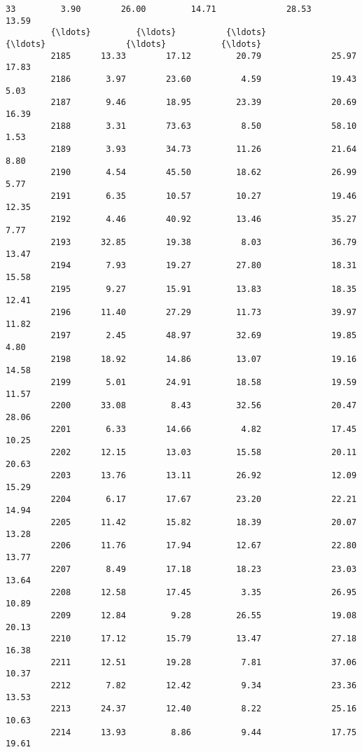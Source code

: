 \documentclass[11pt]{llncs}
\begin{document}
\begin{Verbatim}[commandchars=\\\{\}]
         33         3.90        26.00         14.71              28.53         13.59   
         {\ldots}         {\ldots}          {\ldots}           {\ldots}                {\ldots}           {\ldots}   
         2185      13.33        17.12         20.79              25.97         17.83   
         2186       3.97        23.60          4.59              19.43          5.03   
         2187       9.46        18.95         23.39              20.69         16.39   
         2188       3.31        73.63          8.50              58.10          1.53   
         2189       3.93        34.73         11.26              21.64          8.80   
         2190       4.54        45.50         18.62              26.99          5.77   
         2191       6.35        10.57         10.27              19.46         12.35   
         2192       4.46        40.92         13.46              35.27          7.77   
         2193      32.85        19.38          8.03              36.79         13.47   
         2194       7.93        19.27         27.80              18.31         15.58   
         2195       9.27        15.91         13.83              18.35         12.41   
         2196      11.40        27.29         11.73              39.97         11.82   
         2197       2.45        48.97         32.69              19.85          4.80   
         2198      18.92        14.86         13.07              19.16         14.58   
         2199       5.01        24.91         18.58              19.59         11.57   
         2200      33.08         8.43         32.56              20.47         28.06   
         2201       6.33        14.66          4.82              17.45         10.25   
         2202      12.15        13.03         15.58              20.11         20.63   
         2203      13.76        13.11         26.92              12.09         15.29   
         2204       6.17        17.67         23.20              22.21         14.94   
         2205      11.42        15.82         18.39              20.07         13.28   
         2206      11.76        17.94         12.67              22.80         13.77   
         2207       8.49        17.18         18.23              23.03         13.64   
         2208      12.58        17.45          3.35              26.95         10.89   
         2209      12.84         9.28         26.55              19.08         20.13   
         2210      17.12        15.79         13.47              27.18         16.38   
         2211      12.51        19.28          7.81              37.06         10.37   
         2212       7.82        12.42          9.34              23.36         13.53   
         2213      24.37        12.40          8.22              25.16         10.63   
         2214      13.93         8.86          9.44              17.75         19.61   
         

\end{Verbatim}
\end{document}
